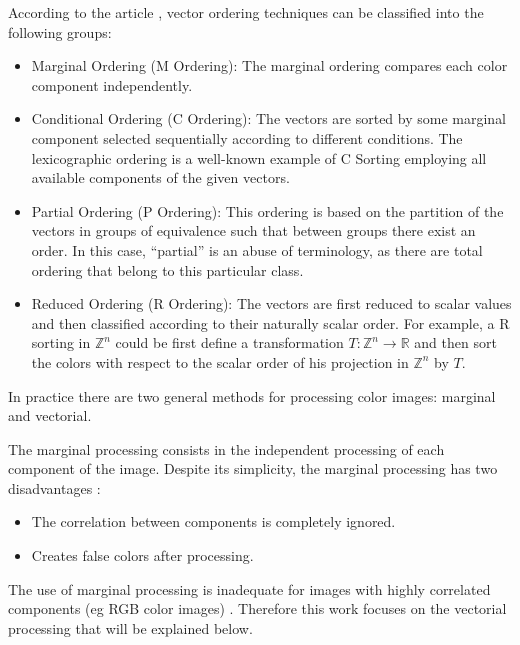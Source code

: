 According to the article \cite{barnett1976ordering}, vector ordering techniques can be classified into the following groups:
\begin{itemize}
\item Marginal Ordering (M Ordering): The marginal ordering compares each color component independently.
\item Conditional Ordering (C Ordering): The vectors are sorted by some marginal component selected sequentially according to different conditions. The lexicographic ordering is a well-known example of C Sorting  employing all available components of the given vectors.
\item Partial Ordering (P Ordering): This ordering is based on the partition of the vectors in groups of equivalence such that between groups there exist an order. In this case, ``partial'' is an abuse of terminology, as there are total ordering that belong to this particular class. 
\item Reduced Ordering (R Ordering): The vectors are first reduced to scalar values and then classified according to their naturally scalar order. For example, a R sorting in  $\mathbb{Z}^n$ could be first define a transformation $T:\mathbb{Z}^n\rightarrow \mathbb{R}$ and then sort the colors with respect to the scalar order of his projection in $\mathbb{Z}^n$ by $T$.
\end{itemize}

In practice there are two general methods for processing color images: marginal and vectorial.

The marginal processing consists in the independent processing of each component of the image. Despite its simplicity, the marginal processing has two disadvantages \cite{aptoula2007comparative}: 
\begin{itemize}
    \item The correlation between components is completely ignored.
    \item Creates false colors after processing.
\end{itemize}

The use of marginal processing is inadequate for images with highly correlated components (eg RGB color images) \cite{astola1990vector}. Therefore this work focuses on the vectorial processing that will be explained below. 


